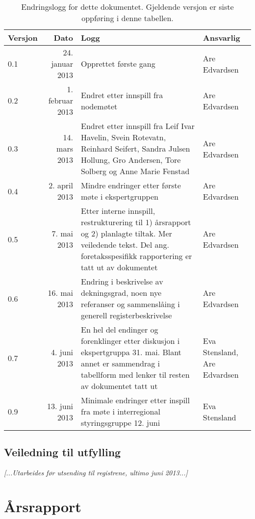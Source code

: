 \documentclass[norsk, a4paper, twocolumn]{report}
\newcommand{\guide}[1] {
	\textit{[\textcolor{guidegray}{#1}]}
	}
\begin{document}
\begin{table}[ht]
  \centering
  \begin{tabular}{lrp{8cm}p{2.5cm}}
    \hline
    Versjon & Dato & Logg & Ansvarlig \\
    \hline
    0.1 & 24. januar 2013 & Opprettet første gang & Are Edvardsen \\
    0.2 & 1. februar 2013 & Endret etter innspill fra nodemøtet &
    Are Edvardsen \\
    0.3 & 14. mars 2013 & Endret etter innspill fra Leif Ivar Havelin,
    Svein Rotevatn,
    Reinhard Seifert, Sandra Julsen Hollung, Gro Andersen, Tore Solberg og
    Anne Marie Fenstad & Are Edvardsen \\
    0.4 & 2. april 2013 & Mindre endringer etter første møte i ekspertgruppen &
    Are Edvardsen \\
    0.5 & 7. mai 2013 & Etter interne innspill, restrukturering til 1)
    årsrapport og 2) planlagte tiltak. Mer veiledende tekst. Del ang.
    foretaksspesifikk rapportering er tatt ut av dokumentet & Are Edvardsen \\
    0.6 & 16. mai 2013 & Endring i beskrivelse av
    dekningsgrad, noen nye referanser og sammenslåing i generell
    registerbeskrivelse & Are Edvardsen \\
    0.7 & 4. juni 2013 & En hel del endinger og forenklinger etter diskusjon i
    ekspertgruppa 31. mai. Blant annet er sammendrag i tabellform med lenker
    til resten av dokumentet tatt ut & Eva Stensland, Are Edvardsen \\
    0.9 & 13. juni 2013 & Minimale endringer etter inspill fra møte i
    interregional styringsgruppe 12. juni & Eva Stensland \\
    \hline
  \end{tabular}
  \caption{Endringslogg for dette dokumentet. Gjeldende versjon er siste
  oppføring i denne tabellen.}
  \label{tab:log}
\end{table}


\chapter*{Veiledning til utfylling}
\guide{...Utarbeides før utsending til registrene, ultimo juni 2013...}



\tableofcontents
\part{Årsrapport}\label{par:rap}
\end{document}
